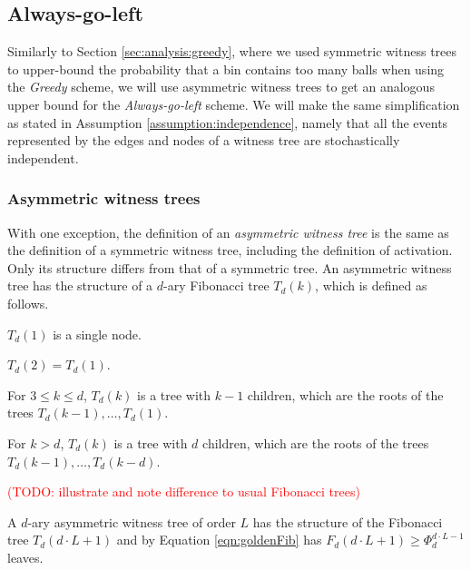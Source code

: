 \documentclass[a4paper,12pt]{article}
\newcommand\todo[1]{\textcolor{red}{(TODO: #1)}}
\begin{document}
\subsection{Always-go-left}
\label{sec:analysis:alg}
Similarly to Section \ref{sec:analysis:greedy}, where we used symmetric witness trees to upper-bound the probability that a bin contains too many balls when using the \emph{Greedy} scheme, we will use asymmetric witness trees to get an analogous upper bound for the \emph{Always-go-left} scheme. We will make the same simplification as stated in Assumption \ref{assumption:independence}, namely that all the events represented by the edges and nodes of a witness tree are stochastically independent.

\subsubsection{Asymmetric witness trees}
\label{sec:analysis:definitionAsymWT}
With one exception, the definition of an \emph{asymmetric witness tree} is the same as the definition of a symmetric witness tree, including the definition of activation. Only its structure differs from that of a symmetric tree. An asymmetric witness tree has the structure of a $d$-ary Fibonacci tree $T_d\left(k \right)$, which is defined as follows.
\begin{compactitem}
\item $T_d(1)$ is a single node.
\item $T_d(2) = T_d(1)$.
\item For $3\leq k \leq d$, $T_d(k)$ is a tree with $k-1$ children, which are the roots of the trees $T_d(k-1),\ldots,T_d(1)$.
\item For $k>d$, $T_d(k)$ is a tree with $d$ children, which are the roots of the trees $T_d(k-1),\ldots,T_d(k-d)$.
\end{compactitem}
\todo{illustrate and note difference to usual Fibonacci trees}

A $d$-ary asymmetric witness tree of order $L$ has the structure of the Fibonacci tree $T_d(d \cdot L+1)$ and by Equation \ref{eqn:goldenFib} has $F_d(d\cdot L + 1) \geq \Phi_d^{d\cdot L-1}$ leaves. 
\end{document}
